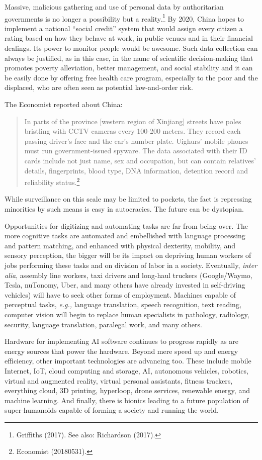 \begin{multicols}{2}
Massive, malicious gathering and use of personal data by authoritarian governments is no longer a possibility but a reality.\footnote{Griffiths (2017). See also: Richardson (2017).}  By 2020, China hopes to implement a national “social credit” system that would assign every citizen a rating based on how they behave at work, in public venues and in their financial dealings. Its power to monitor people would be awesome. Such data collection can always be justified, as in this case, in the name of scientific decision-making that promotes poverty alleviation, better management, and social stability and it can be easily done by offering free health care program, especially to the poor and the displaced, who are often seen as potential law-and-order risk. 

The Economist reported about China:
\begin{quote}
In parts of the province [western region of Xinjiang] streets have poles bristling with CCTV cameras every 100-200 meters. They record each passing driver's face and the car's number plate. Uighurs’ mobile phones must run government-issued spyware. The data associated with their ID cards include not just name, sex and occupation, but can contain relatives’ details, fingerprints, blood type, DNA information, detention record and reliability status.\footnote{Economist (20180531).}
\end{quote}

While surveillance on this scale may be limited to pockets, the fact is repressing minorities by such means is easy in autocracies. The future can be dystopian.

Opportunities for digitizing and automating tasks are far from being over. The more cognitive tasks are automated and embellished with language processing and pattern matching, and enhanced with physical dexterity, mobility, and sensory perception, the bigger will be its impact on depriving human workers of jobs performing these tasks and on division of labor in a society. Eventually, \textit{inter alia}, assembly line workers, taxi drivers and long-haul truckers (Google/Waymo, Tesla, nuTonomy, Uber, and many others have already invested in self-driving vehicles) will have to seek other forms of employment. Machines capable of perceptual tasks, \textit{e.g.,} language translation, speech recognition, text reading, computer vision will begin to replace human specialists in pathology, radiology, security, language translation, paralegal work, and many others.

Hardware for implementing AI software continues to progress rapidly as are energy sources that power the hardware. Beyond mere speed up and energy efficiency, other important technologies are advancing too. These include mobile Internet, IoT, cloud computing and storage, AI, autonomous vehicles, robotics, virtual and augmented reality, virtual personal assistants, fitness trackers, everything cloud, 3D printing, hyperloop, drone services, renewable energy, and machine learning. And finally, there is bionics leading to a future population of super-humanoids capable of forming a society and running the world.


\end{multicols}
